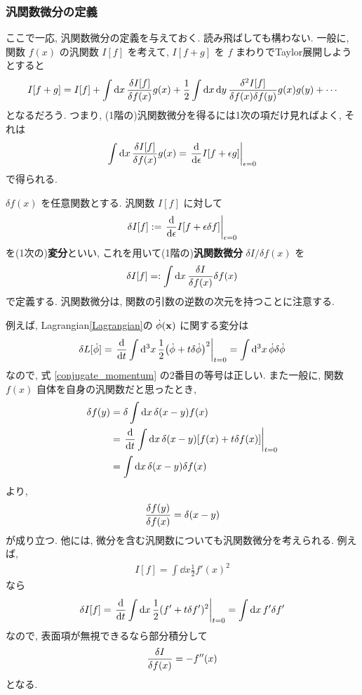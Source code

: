 \documentclass[../note01.tex]{subfiles}
\begin{document}
\subsubsection{汎関数微分の定義}
ここで一応, 汎関数微分の定義を与えておく. 読み飛ばしても構わない.
一般に, 関数 $ f(x) $ の汎関数 $ I[f] $ を考えて, $ I[f+g] $ を $ f $ まわりでTaylor展開しようとすると
\begin{align*}
    I[f+g] = I[f] + \int\dd{x}\fdv{I[f]}{f(x)}g(x) + \frac{1}{2}\int\dd{x}\dd{y}\frac{\delta^2 I[f]}{\delta f(x)\delta f(y)}g(x)g(y) + \cdots
\end{align*}
となるだろう. つまり, (1階の)汎関数微分を得るには1次の項だけ見ればよく, それは
\begin{align*}
    \int\dd{x}\fdv{I[f]}{f(x)}g(x) = \left.\dv{\epsilon}I[f+\epsilon g]\right|_{\epsilon=0}
\end{align*}
で得られる.
\begin{katei}
    $ \delta f(x) $ を任意関数とする. 汎関数 $ I[f] $ に対して
    \begin{align}
        \delta I[f] := \left.\dv{\epsilon}I[f+\epsilon\delta f]\right|_{\epsilon=0}
    \end{align}
    を(1次の)\textbf{変分}といい, これを用いて(1階の)\textbf{汎関数微分} $ \delta I/\delta f(x) $ を
    \begin{align}
        \delta I[f] =: \int\dd{x} \fdv{I}{f(x)} \delta f(x)
    \end{align}
    で定義する. 汎関数微分は, 関数の引数の逆数の次元を持つことに注意する.
\end{katei}
\noindent 例えば, Lagrangian\eqref{Lagrangian}の $ \dot{\phi}(\vb{x}) $ に関する変分は
\begin{align*}
    \delta L[\dot{\phi}] = \left.\dv{t} \int\dd[3]{x} \frac{1}{2}\qty(\dot{\phi}+t\delta\dot{\phi})^2\right|_{t=0}
    = \int\dd[3]{x} \dot{\phi}\delta\dot{\phi}
\end{align*}
なので, 式 \eqref{conjugate_momentum} の2番目の等号は正しい. また一般に, 関数 $ f(x) $ 自体を自身の汎関数だと思ったとき,
\begin{align*}
    \delta f(y) &= \delta \int\dd{x} \delta(x-y)f(x) \\
    &= \left.\dv{t} \int\dd{x} \delta(x-y) \qty[f(x)+t\delta f(x)]\right|_{t=0} \\
    &= \int\dd{x} \delta(x-y)\delta f(x)
\end{align*}
より,
\begin{align*}
    \fdv{f(y)}{f(x)} = \delta(x-y)
\end{align*}
が成り立つ. 他には, 微分を含む汎関数についても汎関数微分を考えられる. 例えば,
\begin{align*}
    I[f] = \int\dd{x} \frac{1}{2}f'(x)^2
\end{align*}
なら
\begin{align*}
    \delta I[f] = \left.\dv{t} \int\dd{x} \frac{1}{2} (f'+t\delta f')^2 \right|_{t=0}
    = \int\dd{x} f'\delta f'
\end{align*}
なので, 表面項が無視できるなら部分積分して
\begin{align*}
    \fdv{I}{f(x)} = -f''(x)
\end{align*}
となる.
\end{document}
